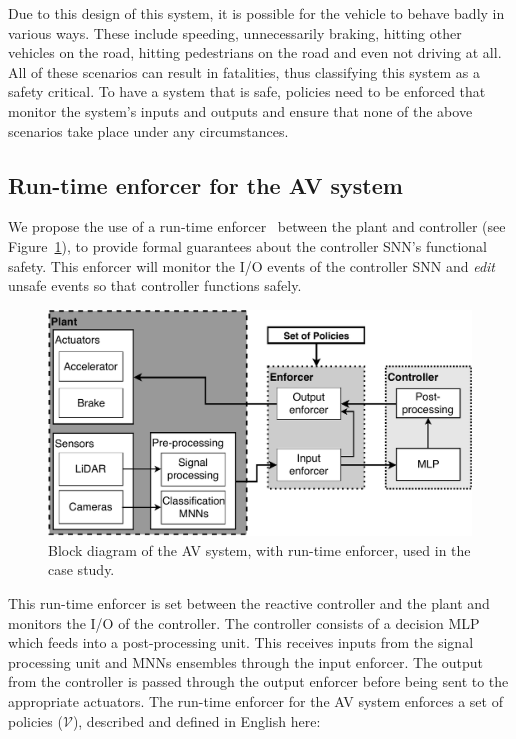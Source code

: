 Due to this design of this system, it is possible for the vehicle to behave badly in various ways. 
These include speeding, unnecessarily braking, hitting other vehicles on the road, hitting pedestrians on the road and even not driving at all.
All of these scenarios can result in fatalities, thus classifying this system as a safety critical.
To have a system that is safe, policies need to be enforced that monitor the system's inputs and outputs and ensure that none of the above scenarios take place under any circumstances.

\subsection{Run-time enforcer for the \acf{AV} system}
We propose the use of a run-time enforcer~\cite{recps} between the plant and controller (see Figure~\ref{fig:avenf}), to provide formal guarantees about the controller \ac{SNN}'s functional safety.
This enforcer will monitor the I/O events of the controller \ac{SNN} and \textit{edit} unsafe events so that controller functions safely.

\begin{figure}[h]
	\centering
	\includegraphics[scale=0.6]{Content/fig/AV-sys.pdf}
	\caption{Block diagram of the \ac{AV} system, with run-time enforcer, used in the case study. \label{fig:avenf}}
\end{figure}

This run-time enforcer is set between the reactive controller and the plant and monitors the I/O of the controller.
The controller consists of a decision \ac{MLP} which feeds into a post-processing unit.
This receives inputs from the signal processing unit and \acp{MNN} ensembles through the input enforcer.
The output from the controller is passed through the output enforcer before being sent to the appropriate actuators.
The run-time enforcer for the \ac{AV} system enforces a set of policies ($\mathcal{V}$), described and defined in English here:

